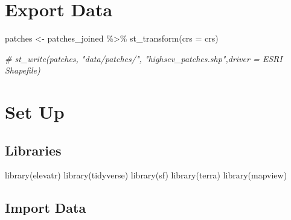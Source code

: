 \documentclass[
]{book}
\newenvironment{Shaded}{\begin{snugshade}}{\end{snugshade}}
\newcommand{\AttributeTok}[1]{\textcolor[rgb]{0.77,0.63,0.00}{#1}}
\newcommand{\CommentTok}[1]{\textcolor[rgb]{0.56,0.35,0.01}{\textit{#1}}}
\newcommand{\FunctionTok}[1]{\textcolor[rgb]{0.00,0.00,0.00}{#1}}
\newcommand{\NormalTok}[1]{#1}
\newcommand{\OtherTok}[1]{\textcolor[rgb]{0.56,0.35,0.01}{#1}}
\newcommand{\SpecialCharTok}[1]{\textcolor[rgb]{0.00,0.00,0.00}{#1}}
\begin{document}
\hypertarget{export-data-1}{%
\chapter{Export Data}\label{export-data-1}}

\begin{Shaded}
\begin{Highlighting}[]
\NormalTok{patches }\OtherTok{\textless{}{-}}\NormalTok{ patches\_joined }\SpecialCharTok{\%\textgreater{}\%}
  \FunctionTok{st\_transform}\NormalTok{(}\AttributeTok{crs =}\NormalTok{ crs)}

\CommentTok{\# st\_write(patches, "data/patches/", "highsev\_patches.shp",driver = \textquotesingle{}ESRI Shapefile\textquotesingle{})}
\end{Highlighting}
\end{Shaded}

\hypertarget{set-up-2}{%
\chapter{Set Up}\label{set-up-2}}

\hypertarget{libraries-1}{%
\section{Libraries}\label{libraries-1}}

\begin{Shaded}
\begin{Highlighting}[]
\FunctionTok{library}\NormalTok{(elevatr)}
\FunctionTok{library}\NormalTok{(tidyverse)}
\FunctionTok{library}\NormalTok{(sf)}
\FunctionTok{library}\NormalTok{(terra)}
\FunctionTok{library}\NormalTok{(mapview)}
\end{Highlighting}
\end{Shaded}

\hypertarget{import-data-2}{%
\section{Import Data}\label{import-data-2}}
\end{document}
